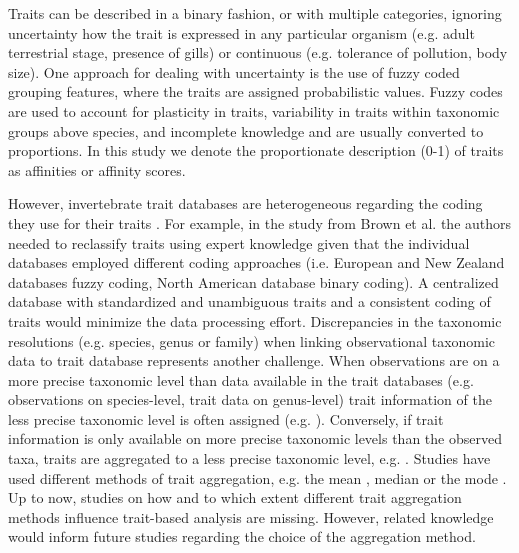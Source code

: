 \documentclass{article}
\begin{document}
Traits can be described in a binary fashion, or with multiple categories, ignoring uncertainty how the trait is expressed in any particular organism (e.g. adult terrestrial stage, presence of gills) or continuous (e.g. tolerance of pollution, body size). One approach for dealing with uncertainty is the use of fuzzy coded grouping features, where the traits are assigned probabilistic values. Fuzzy codes are used to account for plasticity in traits, variability in traits within taxonomic groups above species, and incomplete knowledge and are usually converted to proportions. In this study we denote the proportionate description (0-1) of traits as affinities or affinity scores.

However, invertebrate trait databases are heterogeneous regarding the coding they use for their traits \cite{culp_incorporating_2011}. For example, in the study from Brown et al. \cite{brown_functional_2018} the authors needed to reclassify traits using expert knowledge given that the individual databases employed different coding approaches (i.e. European and New Zealand databases fuzzy coding, North American database binary coding). A centralized database with standardized and unambiguous traits and a consistent coding of traits would minimize the data processing effort. Discrepancies in the taxonomic resolutions (e.g. species, genus or family) when linking observational taxonomic data to trait database represents another challenge. When observations are on a more precise taxonomic level than data available in the trait databases (e.g. observations on species-level, trait data on genus-level) trait information of the less precise taxonomic level is often assigned (e.g. \cite{szocs_effects_2014, vos_taxonomic_2017}). Conversely, if trait information is only available on more precise taxonomic levels than the observed taxa, traits are aggregated to a less precise taxonomic level, e.g. \cite{poff_functional_2006, szocs_effects_2014, piliere_a._f._h._importance_2016, aspin_extreme_2019}. Studies have used different methods of trait aggregation, e.g. the mean \cite{magliozzi_functional_2019}, median \cite{szocs_effects_2014} or the mode \cite{piliere_a._f._h._importance_2016}. Up to now, studies on how and to which extent different trait aggregation methods influence trait-based analysis are missing. However, related knowledge would inform future studies regarding the choice of the aggregation method.
\end{document}
